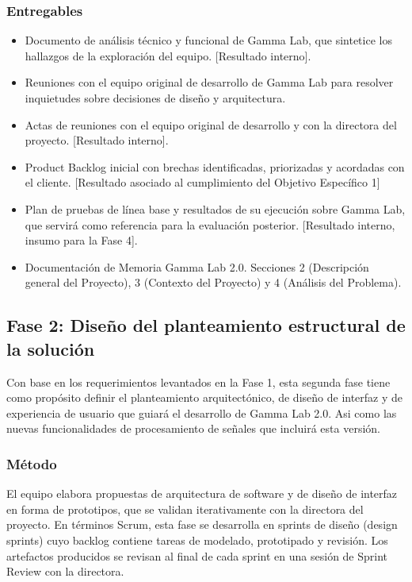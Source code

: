 \documentclass[12pt,letterpaper]{article}
\begin{document}
\subsubsection{Entregables}

\begin{itemize}
  \item Documento de análisis técnico y funcional de Gamma Lab, que sintetice los hallazgos de la exploración del equipo. [Resultado interno].
  \item Reuniones con el equipo original de desarrollo de Gamma Lab para resolver inquietudes sobre decisiones de diseño y arquitectura.
  \item Actas de reuniones con el equipo original de desarrollo y con la directora del proyecto. [Resultado interno].
  \item Product Backlog inicial con brechas identificadas, priorizadas y acordadas con el cliente. [Resultado asociado al cumplimiento del Objetivo Específico 1]
  \item Plan de pruebas de línea base y resultados de su ejecución sobre Gamma Lab, que servirá como referencia para la evaluación posterior. [Resultado interno, insumo para la Fase 4].
  \item Documentación de Memoria Gamma Lab 2.0. Secciones 2 (Descripción general del Proyecto), 3 (Contexto del Proyecto) y 4 (Análisis del Problema).
\end{itemize}


\subsection{Fase 2: Diseño del planteamiento estructural de la solución}

Con base en los requerimientos levantados en la Fase 1, esta segunda fase tiene como propósito definir el planteamiento arquitectónico, de diseño de interfaz y de experiencia de usuario que guiará el desarrollo de Gamma Lab 2.0. Asi como las nuevas funcionalidades de procesamiento de señales que incluirá esta versión. 

\subsubsection{Método}
El equipo elabora propuestas de arquitectura de software y de diseño de interfaz en forma de prototipos, que se validan iterativamente con la directora del proyecto. En términos Scrum, esta fase se desarrolla en sprints de diseño (design sprints) cuyo backlog contiene tareas de modelado, prototipado y revisión. Los artefactos producidos se revisan al final de cada sprint en una sesión de Sprint Review con la directora.
\end{document}
